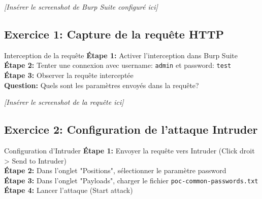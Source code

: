 \documentclass[12pt,a4paper]{article}
\begin{document}
\begin{answerbox}
\vspace{7cm}
\end{answerbox}

\begin{screenshotbox}
\centering
\textit{[Insérer le screenshot de Burp Suite configuré ici]}
\end{screenshotbox}

\subsection{Exercice 1: Capture de la requête HTTP}

\begin{exercicebox}{Interception de la requête}
\textbf{Étape 1:} Activer l'interception dans Burp Suite\\
\textbf{Étape 2:} Tenter une connexion avec username: \texttt{admin} et password: \texttt{test}\\
\textbf{Étape 3:} Observer la requête interceptée\\
\textbf{Question:} Quels sont les paramètres envoyés dans la requête?
\end{exercicebox}

\begin{answerbox}
\vspace{7cm}
\end{answerbox}

\begin{screenshotbox}
\centering
\textit{[Insérer le screenshot de la requête ici]}
\end{screenshotbox}

\subsection{Exercice 2: Configuration de l'attaque Intruder}

\begin{exercicebox}{Configuration d'Intruder}
\textbf{Étape 1:} Envoyer la requête vers Intruder (Click droit > Send to Intruder)\\
\textbf{Étape 2:} Dans l'onglet "Positions", sélectionner le paramètre password\\
\textbf{Étape 3:} Dans l'onglet "Payloads", charger le fichier \texttt{poc-common-passwords.txt}\\
\textbf{Étape 4:} Lancer l'attaque (Start attack)
\end{exercicebox}
\end{document}
